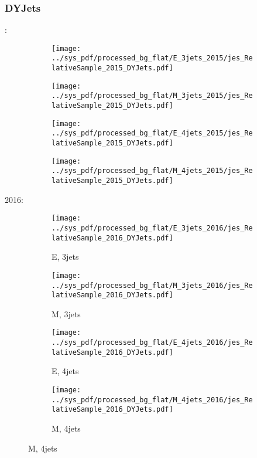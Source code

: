 \documentclass{beamer}
\begin{document}
\begin{frame}
\frametitle{DYJets}
\fontsize{5}{1}:
\begin{figure}
\centering
\begin{subfigure}[b]{0.24\textwidth}
\texttt{[image: ../sys\_pdf/processed\_bg\_flat/E\_3jets\_2015/jes\_RelativeSample\_2015\_DYJets.pdf]}
\end{subfigure}
\begin{subfigure}[b]{0.24\textwidth}
\texttt{[image: ../sys\_pdf/processed\_bg\_flat/M\_3jets\_2015/jes\_RelativeSample\_2015\_DYJets.pdf]}
\end{subfigure}
\begin{subfigure}[b]{0.24\textwidth}
\texttt{[image: ../sys\_pdf/processed\_bg\_flat/E\_4jets\_2015/jes\_RelativeSample\_2015\_DYJets.pdf]}
\end{subfigure}
\begin{subfigure}[b]{0.24\textwidth}
\texttt{[image: ../sys\_pdf/processed\_bg\_flat/M\_4jets\_2015/jes\_RelativeSample\_2015\_DYJets.pdf]}
\end{subfigure}
\end{figure}
2016:
\begin{figure}
\centering
\begin{subfigure}[b]{0.24\textwidth}
\texttt{[image: ../sys\_pdf/processed\_bg\_flat/E\_3jets\_2016/jes\_RelativeSample\_2016\_DYJets.pdf]}
\captionsetup{font=tiny}
\caption{E, 3jets}
\end{subfigure}
\begin{subfigure}[b]{0.24\textwidth}
\texttt{[image: ../sys\_pdf/processed\_bg\_flat/M\_3jets\_2016/jes\_RelativeSample\_2016\_DYJets.pdf]}
\captionsetup{font=tiny}
\caption{M, 3jets}
\end{subfigure}
\begin{subfigure}[b]{0.24\textwidth}
\texttt{[image: ../sys\_pdf/processed\_bg\_flat/E\_4jets\_2016/jes\_RelativeSample\_2016\_DYJets.pdf]}
\captionsetup{font=tiny}
\caption{E, 4jets}
\end{subfigure}
\begin{subfigure}[b]{0.24\textwidth}
\texttt{[image: ../sys\_pdf/processed\_bg\_flat/M\_4jets\_2016/jes\_RelativeSample\_2016\_DYJets.pdf]}
\captionsetup{font=tiny}
\caption{M, 4jets}
\end{subfigure}
\end{figure}
\end{frame}
\end{document}
